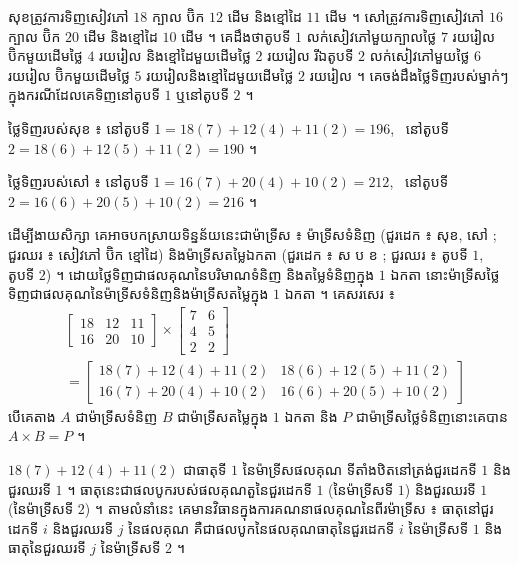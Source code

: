 \begin{example}[ឧទាហរណ៍ ១]
សុខត្រូវការទិញសៀវភៅ $18$ ក្បាល ប៊ិក $12$ ដើម និងខ្មៅដៃ $11$ ដើម ។ សៅត្រូវការទិញសៀវភៅ $16$ ក្បាល ប៊ិក $20$ ដើម និងខ្មៅដៃ $10$ ដើម ។ គេដឹងថាតូបទី $1$ លក់សៀវភៅមួយក្បាលថ្លៃ $7$ រយរៀល ប៊ិកមួយដើមថ្លៃ $4$ រយរៀល និងខ្មៅដៃមួយដើមថ្លៃ $2$ រយរៀល រីឯតូបទី $2$ លក់សៀវភៅមួយថ្លៃ $6$ រយរៀល ប៊ិកមួយដើមថ្លៃ $5$ រយរៀលនិងខ្មៅដៃមួយដើមថ្លៃ $2$ រយរៀល ។ គេចង់ដឹងថ្លៃទិញរបស់ម្នាក់ៗក្នុងករណីដែលគេទិញនៅតូបទី $1$ ឬនៅតូបទី $2$ ។

ថ្លៃទិញរបស់សុខ ៖ នៅតូបទី $1 = 18(7) + 12(4) + 11(2) = 196$, \ នៅតូបទី $2 = 18(6) + 12(5) + 11(2) = 190$ ។

ថ្លៃទិញរបស់សៅ ៖ នៅតូបទី $1 = 16(7) + 20(4) + 10(2) = 212$, \ នៅតូបទី $2 = 16(6) + 20(5) + 10(2) = 216$ ។

ដើម្បីងាយសិក្សា គេអាចបកស្រាយទិន្នន័យនេះជាម៉ាទ្រីស ៖ ម៉ាទ្រីសទំនិញ (ជួរដេក ៖ សុខ, សៅ ; ជួរឈរ ៖ សៀវភៅ ប៊ិក ខ្មៅដៃ) និងម៉ាទ្រីសតម្លៃឯកតា (ជួរដេក ៖ ស ប ខ ; ជួរឈរ ៖ តូបទី $1$, តូបទី $2$) ។ ដោយថ្លៃទិញជាផលគុណនៃបរិមាណទំនិញ និងតម្លៃទំនិញក្នុង $1$ ឯកតា នោះម៉ាទ្រីសថ្លៃទិញជាផលគុណនៃម៉ាទ្រីសទំនិញនិងម៉ាទ្រីសតម្លៃក្នុង $1$ ឯកតា ។ គេសរសេរ ៖
\[
\begin{aligned}
&\begin{bmatrix} 18 & 12 & 11\\ 16 & 20 & 10 \end{bmatrix} \times \begin{bmatrix} 7 & 6\\ 4 & 5\\ 2 & 2 \end{bmatrix}\\
&= \begin{bmatrix} 18(7) + 12(4) + 11(2) & 18(6) + 12(5) + 11(2)\\ 16(7) + 20(4) + 10(2) & 16(6) + 20(5) + 10(2) \end{bmatrix}
\end{aligned}
\]
បើគេតាង $A$ ជាម៉ាទ្រីសទំនិញ $B$ ជាម៉ាទ្រីសតម្លៃក្នុង $1$ ឯកតា និង $P$ ជាម៉ាទ្រីសថ្លៃទំនិញនោះគេបាន $A \times B = P$ ។
\end{example}

\begin{note}[សង្កេត]
$18(7) + 12(4) + 11(2)$ ជាធាតុទី $1$ នៃម៉ាទ្រីសផលគុណ ទីតាំងឋិតនៅត្រង់ជួរដេកទី $1$ និងជួរឈរទី $1$ ។ ធាតុនេះជាផលបូករបស់ផលគុណតួនៃជួរដេកទី $1$ (នៃម៉ាទ្រីសទី $1$) និងជួរឈរទី $1$ (នៃម៉ាទ្រីសទី $2$) ។ តាមលំនាំនេះ គេមានវិធានក្នុងការគណនាផលគុណនៃពីរម៉ាទ្រីស ៖ ធាតុនៅជួរដេកទី $i$ និងជួរឈរទី $j$ នៃផលគុណ គឺជាផលបូកនៃផលគុណធាតុនៃជួរដេកទី $i$ នៃម៉ាទ្រីសទី $1$ និងធាតុនៃជួរឈរទី $j$ នៃម៉ាទ្រីសទី $2$ ។
\end{note}

